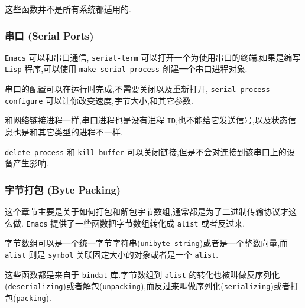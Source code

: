 \documentclass[11pt]{article}
\begin{document}
这些函数并不是所有系统都适用的.



\subsubsection{串口 (Serial Ports)}
\label{sec:org8eda23d}

\texttt{Emacs} 可以和串口通信, \texttt{serial-term} 可以打开一个为使用串口的终端,如果是编写 \texttt{Lisp} 程序,可以使用 \texttt{make-serial-process} 创建一个串口进程对象.

串口的配置可以在运行时完成,不需要关闭以及重新打开, \texttt{serial-process-configure} 可以让你改变速度,字节大小,和其它参数.

和网络链接进程一样,串口进程也是没有进程 \texttt{ID},也不能给它发送信号,以及状态信息也是和其它类型的进程不一样.

\texttt{delete-process} 和 \texttt{kill-buffer} 可以关闭链接,但是不会对连接到该串口上的设备产生影响.


\subsubsection{字节打包 (Byte Packing)}
\label{sec:org152342e}

这个章节主要是关于如何打包和解包字节数组,通常都是为了二进制传输协议才这么做. \texttt{Emacs} 提供了一些函数把字节数组转化成 \texttt{alist} 或者反过来.

字节数组可以是一个统一字节字符串(\texttt{unibyte string})或者是一个整数向量,而 \texttt{alist} 则是 \texttt{symbol} 关联固定大小的对象或者是一个 \texttt{alist}.

这些函数都是来自于 \texttt{bindat} 库.字节数组到 \texttt{alist} 的转化也被叫做反序列化(\texttt{deserializing})或者解包(\texttt{unpacking}),而反过来叫做序列化(\texttt{serializing})或者打包(\texttt{packing}).
\end{document}
